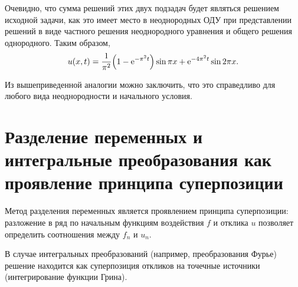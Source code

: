 Очевидно, что сумма решений этих двух подзадач будет являться решением исходной
задачи, как это имеет место в неоднородных ОДУ при представлении решений в виде
частного решения неоднородного уравнения и общего решения однородного. Таким
образом,
\[
    u(x, t) = \frac{1}{\pi^2}\Bigl(1 - \mathrm{e}^{-\pi^2 t}\Bigr)\sin\pi x +
    \mathrm{e}^{-4\pi^2 t}\sin2\pi x.
\]

Из вышеприведенной аналогии можно заключить, что это справедливо для любого вида
неоднородности и начального условия.

\section{Разделение переменных и интегральные преобразования как проявление
принципа суперпозиции}

Метод разделения переменных является проявлением принципа суперпозиции:
разложение в ряд по начальным функциям воздействия \( f \) и отклика \( u \)
позволяет определить соотношения между \( f_n \) и \( u_n \).

В случае интегральных преобразований (например, преобразования Фурье) решение
находится как суперпозиция откликов на точечные источники (интегрирование
функции Грина).

\newpage
